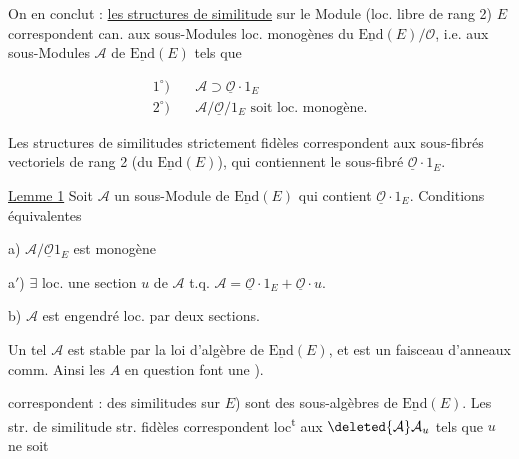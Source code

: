 
On en conclut : \uline{les structures de similitude} sur le Module (loc. libre de rang 2) $E$ correspondent can. aux sous-Modules loc. monogènes du  $\underline{\mathrm{End}}(E)/\mathcal O$, i.e. aux sous-Modules $\mathcal A$ de $\underline{\mathrm{End}}(E)$ tels que

\[
\begin{aligned}
1^\circ)&\quad\mathcal A\supset\underline{\mathcal O}\cdot1_E\\
2^\circ)&\quad\mathcal A/\underline{\mathcal O}/1_E \text{ soit loc. monogène.}
\end{aligned}
\]

Les structures de similitudes strictement fidèles correspondent aux sous-fibrés vectoriels de rang 2 (du  $\underline{\mathrm{End}}(E)$), qui contiennent le sous-fibré $\underline{\mathcal O}\cdot1_E$.

\uline{Lemme 1} Soit $\mathcal A$ un sous-Module de $\underline{\mathrm{End}}(E)$ qui contient $\underline{\mathcal O}\cdot1_E$. Conditions équivalentes

a) $\mathcal A/\underline{\mathcal O}1_E$ est monogène

a$'$) $\exists$ loc. une section $u$ de $\mathcal A$ t.q. $\mathcal A=\underline{\mathcal O}\cdot1_E+\underline{\mathcal O}\cdot u$.

b) $\mathcal A$ est engendré loc. par deux sections.


Un tel $\mathcal A$ est stable par  la loi d'algèbre de $\underline{\mathrm{End}}(E)$, et est un faisceau d'anneaux comm. Ainsi  les $A$ en question  font une ). 

correspondent : des  similitudes sur $E$) sont des sous-algèbres  de $\underline{\mathrm{End}}(E)$. Les str. de similitude str. fidèles correspondent loc\textsuperscript{t} aux $\deleted{\mathcal A}\mathcal A_u$  tels que $u$ ne soit
